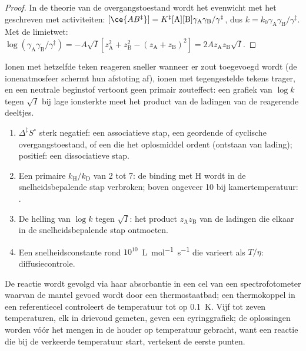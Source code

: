 \begin{proof}
In de theorie van de overgangstoestand wordt het evenwicht met het  geschreven met activiteiten: $[\ce{AB^{\ddagger}}] = K^{\ddagger}[\mathrm A][\mathrm B]\gamma_{\mathrm A}\gamma_{\mathrm B}/\gamma^{\ddagger}$, dus $k = k_0\gamma_{\mathrm A}\gamma_{\mathrm B}/\gamma^{\ddagger}$.
Met de limietwet: $\log(\gamma_{\mathrm A}\gamma_{\mathrm B}/\gamma^{\ddagger}) = -A\sqrt I[z_{\mathrm A}^2 + z_{\mathrm B}^2 - (z_{\mathrm A} + z_{\mathrm B})^2] =
2Az_{\mathrm A}z_{\mathrm B}\sqrt I$.
\end{proof}

Ionen met hetzelfde teken reageren sneller wanneer er zout toegevoegd
wordt (de ionenatmosfeer schermt hun afstoting af), ionen met
tegengestelde tekens trager, en een neutrale beginstof vertoont geen
primair zouteffect: een grafiek van $\log k$ tegen $\sqrt I$ bij lage
ionsterkte meet het product van de ladingen van de reagerende deeltjes.

\begin{method}\label{met:b3:rate-theories:mechanism-evidence}
\begin{enumerate}
  \item $\Delta^{\ddagger}S^\circ$ sterk negatief: een associatieve stap,
        een geordende of cyclische overgangstoestand, of een die het
        oplosmiddel ordent (ontstaan van lading); positief: een
        dissociatieve stap.
  \item Een primaire $k_{\mathrm H}/k_{\mathrm D}$ van 2 tot 7: de binding
        met H wordt in de snelheidsbepalende stap verbroken; boven ongeveer
        10 bij kamertemperatuur: .
  \item De helling van $\log k$ tegen $\sqrt I$: het product $z_{\mathrm A}z_{\mathrm B}$ van de
        ladingen die elkaar in de snelheidsbepalende stap ontmoeten.
  \item Een snelheidsconstante rond $10^{10}$~\unit{L.mol^{-1}.s^{-1}} die varieert als $T/\eta$:
        diffusiecontrole.
\end{enumerate}
\end{method}

\begin{inthelab}
De reactie wordt gevolgd via haar absorbantie in een cel van een
spectrofotometer waarvan de mantel gevoed wordt door een thermostaatbad;
een thermokoppel in een referentiecel controleert de temperatuur tot op
\qty{0.1}{K}. Vijf tot zeven temperaturen, elk in drievoud gemeten, geven
een eyringgrafiek; de oplossingen worden vóór het mengen in de houder op
temperatuur gebracht, want een reactie die bij de verkeerde temperatuur
start, vertekent de eerste punten.
\end{inthelab}

